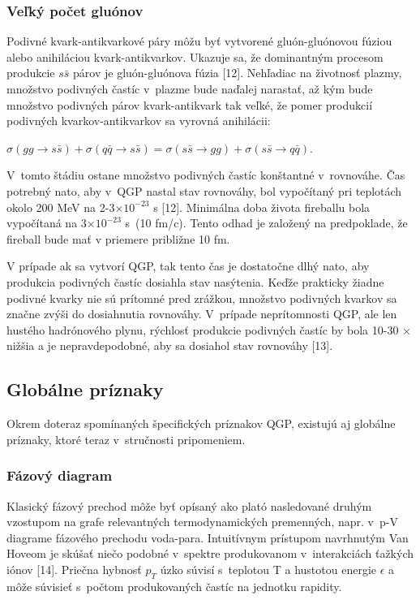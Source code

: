 \subsubsection{Veľký počet gluónov}
Podivné kvark-antikvarkové páry môžu byť vytvorené
gluón-gluónovou fúziou alebo anihiláciou kvark-antikvarkov.
Ukazuje sa, že dominantným
procesom produkcie $s\bar{s}$ párov je gluón-gluónova fúzia [12].
Nehľadiac na životnosť plazmy, množstvo podivných
častíc v~plazme bude naďalej narastať, až kým bude
množstvo podivných párov kvark-antikvark tak veľké, že 
pomer produkcií podivných kvarkov-antikvarkov  sa vyrovná anihilácii:
\begin{center}
  $\sigma(gg \rightarrow s\bar{s}) + \sigma(q\bar{q} \rightarrow s\bar{s}) = 
\sigma(s\bar{s} \rightarrow gg) + \sigma(s\bar{s} \rightarrow q\bar{q})$.
\end{center}
V~tomto štádiu ostane množstvo podivných častíc
konštantné v~rovnováhe. Čas potrebný nato, aby v~QGP nastal
stav rovnováhy, bol vypočítaný pri teplotách okolo 200 MeV  na
2-3$\times 10^{-23}$ s [12]. Minimálna doba života fireballu bola
vypočítaná na  3$\times 10^{-23}$ s~(10 fm/c). Tento odhad
je založený na predpoklade, že fireball bude mať v
priemere približne 10 fm.

V prípade ak sa vytvorí QGP, tak
tento čas je dostatočne dlhý nato, aby produkcia podivných
častíc dosiahla stav nasýtenia.  Keďže prakticky
žiadne podivné kvarky nie sú prítomné pred zrážkou,
množstvo podivných kvarkov sa značne zvýši do dosiahnutia
rovnováhy. V~prípade neprítomnosti QGP, ale len hustého
hadrónového plynu, rýchlosť produkcie podivných častíc
by bola 10-30 $\times$ nižšia a je nepravdepodobné, aby sa dosiahol
stav rovnováhy [13].

\subsection{Globálne príznaky}
Okrem doteraz spomínaných špecifických príznakov QGP,
existujú aj globálne príznaky, ktoré teraz v~stručnosti
pripomeniem. 
\subsubsection{Fázový diagram}
Klasický fázový prechod môže byť opísaný ako plató
nasledované druhým vzostupom na grafe relevantných termodynamických
premenných, napr. v~p-V diagrame fázového prechodu voda-para.
Intuitívnym prístupom navrhnutým Van Hoveom je skúšať
niečo podobné v~spektre produkovanom v~interakciách ťažkých
iónov [14]. Priečna hybnosť $p_{T}$  úzko
súvisí s~teplotou T a hustotou energie $\epsilon$ a môže
súvisieť s~počtom produkovaných častíc na jednotku
rapidity.

